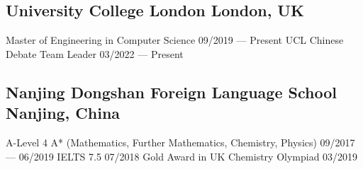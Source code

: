
\subsection{University College London \hfill London, UK}
    Master of Engineering in Computer Science 
        \hfill 09/2019 --- Present 
    \newline
    UCL Chinese Debate Team Leader
        \hfill 03/2022 --- Present


\vspace{0.3em}


\subsection{Nanjing Dongshan Foreign Language School \hfill Nanjing, China}
    A-Level 4 A* (Mathematics, Further Mathematics, Chemistry, Physics) 
        \hfill 09/2017 --- 06/2019 
    \newline
    IELTS 7.5 
        \hfill 07/2018 
    \newline
    Gold Award in UK Chemistry Olympiad
        \hfill 03/2019


